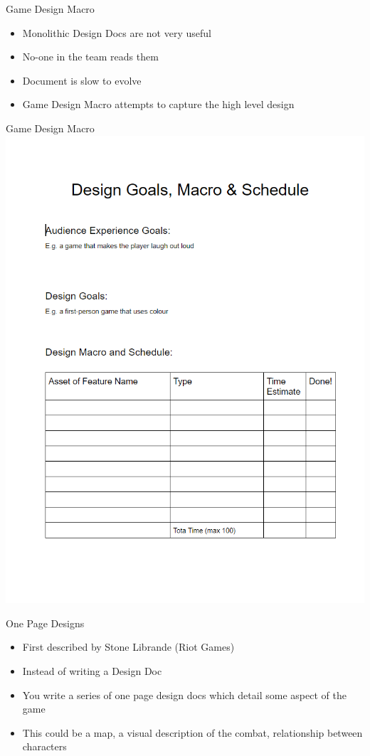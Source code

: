 \begin{frame}{Game Design Macro}
	\begin{itemize}
		\item Monolithic Design Docs are not very useful
		\item No-one in the team reads them
		\item Document is slow to evolve
		\item Game Design Macro attempts to capture the high level design 
	\end{itemize}
\end{frame}

\begin{frame}{Game Design Macro}
\includegraphics[width=1.0\textwidth]{game_design_macro}
\end{frame}

\begin{frame}{One Page Designs}
	\begin{itemize}
		\item First described by Stone Librande (Riot Games) 
		\item Instead of writing a Design Doc
		\item You write a series of one page design docs which detail some aspect of the game
		\item This could be a map, a visual description of the combat, relationship between characters
	\end{itemize}
\end{frame}

